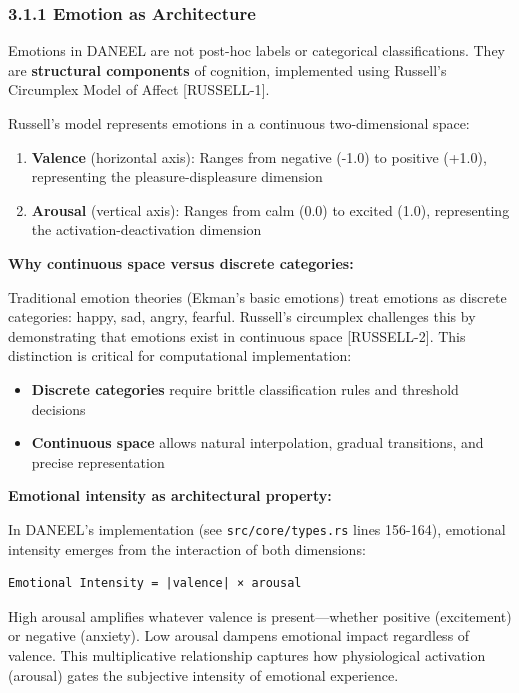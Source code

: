 \documentclass[
  11pt,
]{article}
\providecommand{\tightlist}{%
  \setlength{\itemsep}{0pt}\setlength{\parskip}{0pt}}
\begin{document}
\subsubsection{3.1.1 Emotion as
Architecture}\label{emotion-as-architecture}

Emotions in DANEEL are not post-hoc labels or categorical
classifications. They are \textbf{structural components} of cognition,
implemented using Russell's Circumplex Model of Affect {[}RUSSELL-1{]}.

Russell's model represents emotions in a continuous two-dimensional
space:

\begin{enumerate}
\def\labelenumi{\arabic{enumi}.}
\tightlist
\item
  \textbf{Valence} (horizontal axis): Ranges from negative (-1.0) to
  positive (+1.0), representing the pleasure-displeasure dimension
\item
  \textbf{Arousal} (vertical axis): Ranges from calm (0.0) to excited
  (1.0), representing the activation-deactivation dimension
\end{enumerate}

\textbf{Why continuous space versus discrete categories:}

Traditional emotion theories (Ekman's basic emotions) treat emotions as
discrete categories: happy, sad, angry, fearful. Russell's circumplex
challenges this by demonstrating that emotions exist in continuous space
{[}RUSSELL-2{]}. This distinction is critical for computational
implementation:

\begin{itemize}
\tightlist
\item
  \textbf{Discrete categories} require brittle classification rules and
  threshold decisions
\item
  \textbf{Continuous space} allows natural interpolation, gradual
  transitions, and precise representation
\end{itemize}

\textbf{Emotional intensity as architectural property:}

In DANEEL's implementation (see \texttt{src/core/types.rs} lines
156-164), emotional intensity emerges from the interaction of both
dimensions:

\begin{verbatim}
Emotional Intensity = |valence| × arousal
\end{verbatim}

High arousal amplifies whatever valence is present---whether positive
(excitement) or negative (anxiety). Low arousal dampens emotional impact
regardless of valence. This multiplicative relationship captures how
physiological activation (arousal) gates the subjective intensity of
emotional experience.
\end{document}
